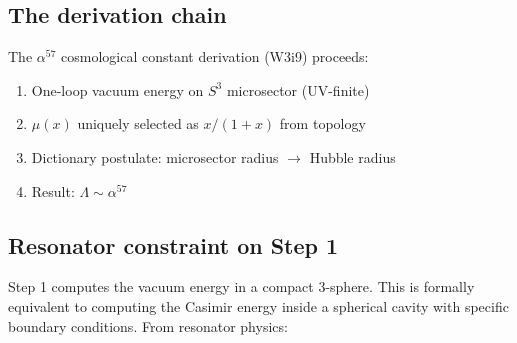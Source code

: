 \documentclass[11pt]{article}
\theoremstyle{definition}
\theoremstyle{remark}
\begin{document}
\subsection{The derivation chain}

The $\alpha^{57}$ cosmological constant derivation (W3i9) proceeds:
\begin{enumerate}[nosep]
\item One-loop vacuum energy on $S^3$ microsector (UV-finite)
\item $\mu(x)$ uniquely selected as $x/(1+x)$ from topology
\item Dictionary postulate: microsector radius $\to$ Hubble radius
\item Result: $\Lambda \sim \alpha^{57}$
\end{enumerate}

\subsection{Resonator constraint on Step 1}

Step 1 computes the vacuum energy in a compact 3-sphere. This is
formally equivalent to computing the Casimir energy inside a
spherical cavity with specific boundary conditions. From resonator
physics:
\end{document}
